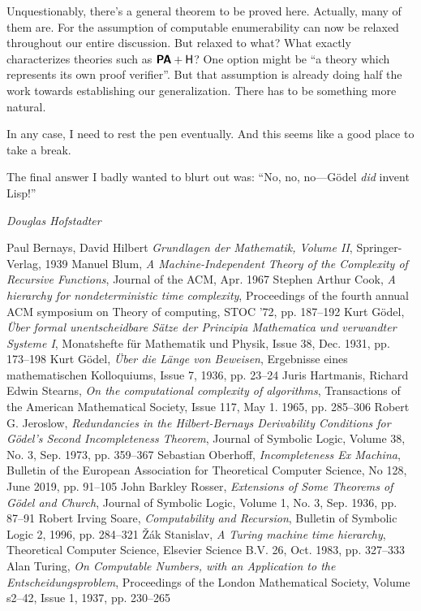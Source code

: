 \documentclass{article}
\theoremstyle{customstyle}
\newcommand{\PA}{\textbf{\textsf{PA}}}
\begin{document}
Unquestionably, there's a general theorem to be proved here. Actually, many of them are. For the assumption of computable enumerability can now be relaxed throughout our entire discussion. But relaxed to what? What exactly characterizes theories such as $\PA + \mathsf{H}$? One option might be ``a theory which represents its own proof verifier''. But that assumption is already doing half the work towards establishing our generalization. There has to be something more natural.

In any case, I need to rest the pen eventually. And this seems like a good place to take a break.
\vspace{-0.2cm}

\epigraph{The final answer I badly wanted to blurt out was: ``No, no, no---Gödel \emph{did} invent Lisp!''}{\textit{Douglas Hofstadter}}

\begin{thebibliography}{12}
  Paul Bernays, David Hilbert \textit{Grundlagen der Mathematik, Volume II}, Springer-Verlag, 1939
  Manuel Blum, \textit{A Machine-Independent Theory of the Complexity of Recursive Functions}, Journal of the ACM, Apr. 1967
  Stephen Arthur Cook, \textit{A hierarchy for nondeterministic time complexity}, Proceedings of the fourth annual ACM symposium on Theory of computing, STOC '72, pp. 187--192
  Kurt Gödel, \textit{Über formal unentscheidbare Sätze der Principia Mathematica und verwandter Systeme I}, Monatshefte für Mathematik und Physik, Issue 38, Dec. 1931, pp. 173--198
  Kurt Gödel, \textit{Über die Länge von Beweisen}, Ergebnisse eines mathematischen Kolloquiums, Issue 7, 1936, pp. 23--24
  Juris Hartmanis, Richard Edwin Stearns, \textit{On the computational complexity of algorithms}, Transactions of the American Mathematical Society, Issue 117, May 1. 1965, pp. 285--306
  Robert G. Jeroslow, \textit{Redundancies in the Hilbert-Bernays Derivability Conditions for Gödel's Second Incompleteness Theorem}, Journal of Symbolic Logic, Volume 38, No. 3, Sep. 1973, pp. 359--367
  Sebastian Oberhoff, \textit{Incompleteness Ex Machina}, Bulletin of the European Association for Theoretical Computer Science, No 128, June 2019, pp. 91--105
  John Barkley Rosser, \textit{Extensions of Some Theorems of Gödel and Church}, Journal of Symbolic Logic, Volume 1, No. 3, Sep. 1936, pp. 87--91
  Robert Irving Soare, \textit{Computability and Recursion}, Bulletin of Symbolic Logic 2, 1996, pp. 284--321
  \v{Z}ák Stanislav, \textit{A Turing machine time hierarchy}, Theoretical Computer Science, Elsevier Science B.V. 26, Oct. 1983, pp. 327--333
  Alan Turing, \textit{On Computable Numbers, with an Application to the Entscheidungsproblem}, Proceedings of the London Mathematical Society, Volume s2--42, Issue 1, 1937, pp. 230--265
\end{thebibliography}

\vfill\eject
\end{document}
